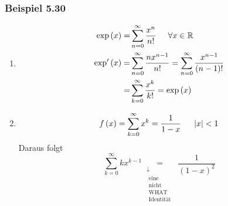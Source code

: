 \subsubsection*{Beispiel 5.30}
\begin{enumerate}
\item \begin{align*}
\exp \left( x \right) = &\sum\limits_{n = 0}^\infty  {\frac{{{x^n}}}{{n!}}} \hspace{5mm}\forall x \in \mathbb{R}\\
{\mathop{\rm exp'}\nolimits} \left( x \right) = &\sum\limits_{n = 0}^\infty  {\frac{{n{x^{n - 1}}}}{{n!}}}  = \sum\limits_{n = 0}^\infty  {\frac{{{x^{n - 1}}}}{{\left( {n - 1} \right)!}}} \\
 = &\sum\limits_{k = 0}^\infty  {\frac{{{x^k}}}{{k!}}}  = \exp \left( x \right)
\end{align*}
\item \[f\left( x \right) = \sum\limits_{k = 0}^\infty  {{x^k}}  = \frac{1}{{1 - x}}\hspace{5mm}\left| x \right| < 1\]
Daraus folgt
\[\sum\limits_{k = 0}^\infty  {k{x^{k - 1}}} \mathop  = \limits_{\begin{array}{*{20}{c}}
 \downarrow \\
\begin{array}{c}
{\text{eine }}\\
{\text{nicht}}\\
{\text{WHAT}}\\
{\text{Identität}}
\end{array}
\end{array}} \frac{1}{{{{\left( {1 - x} \right)}^2}}}\]
\end{enumerate}